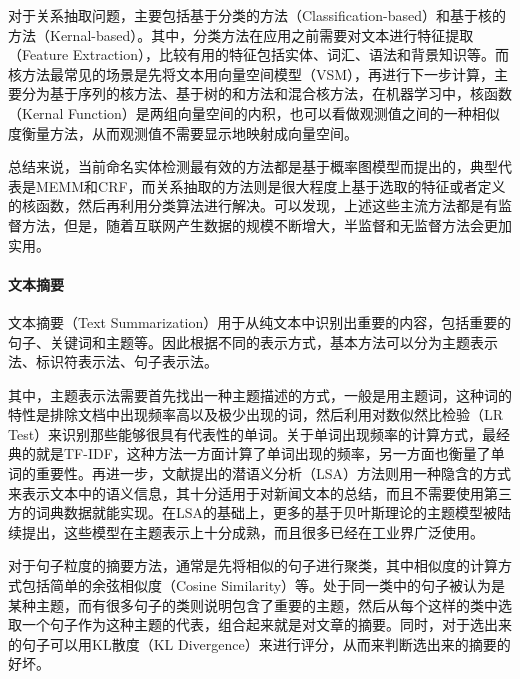 对于关系抽取问题，主要包括基于分类的方法（Classification-based）\cite{kambhatla2004combining,guodong2005exploring,jiang2007systematic,chan2010exploiting}和基于核的方法（Kernal-based）\cite{bunescu2005shortest,zhao2005extracting}。其中，分类方法在应用之前需要对文本进行特征提取（Feature Extraction），比较有用的特征包括实体、词汇、语法和背景知识等。而核方法最常见的场景是先将文本用向量空间模型（VSM），再进行下一步计算，主要分为基于序列的核方法、基于树的和方法和混合核方法，在机器学习中，核函数（Kernal Function）是两组向量空间的内积，也可以看做观测值之间的一种相似度衡量方法，从而观测值不需要显示地映射成向量空间。

总结来说，当前命名实体检测最有效的方法都是基于概率图模型而提出的，典型代表是MEMM和CRF，而关系抽取的方法则是很大程度上基于选取的特征或者定义的核函数，然后再利用分类算法进行解决。可以发现，上述这些主流方法都是有监督方法，但是，随着互联网产生数据的规模不断增大，半监督和无监督方法会更加实用。

\paragraph{文本摘要}
文本摘要（Text Summarization）用于从纯文本中识别出重要的内容，包括重要的句子、关键词和主题等。因此根据不同的表示方式，基本方法可以分为主题表示法、标识符表示法、句子表示法。

其中，主题表示法需要首先找出一种主题描述的方式，一般是用主题词，这种词的特性是排除文档中出现频率高以及极少出现的词，然后利用对数似然比检验（LR Test）来识别那些能够很具有代表性的单词\cite{dunning1993accurate}。关于单词出现频率的计算方式，最经典的就是TF-IDF\cite{gupta2007measuring}，这种方法一方面计算了单词出现的频率，另一方面也衡量了单词的重要性。再进一步，文献\cite{deerwester1990indexing}提出的潜语义分析（LSA）方法则用一种隐含的方式来表示文本中的语义信息，其十分适用于对新闻文本的总结，而且不需要使用第三方的词典数据就能实现。在LSA的基础上，更多的基于贝叶斯理论的主题模型被陆续提出，这些模型在主题表示上十分成熟，而且很多已经在工业界广泛使用\cite{daume2006bayesian,haghighi2009exploring,wang2009multi,celikyilmaz2010hybrid}。

对于句子粒度的摘要方法，通常是先将相似的句子进行聚类\cite{mckeown1999towards,hatzivassiloglou2001simfinder}，其中相似度的计算方式包括简单的余弦相似度（Cosine Similarity）等。处于同一类中的句子被认为是某种主题，而有很多句子的类则说明包含了重要的主题，然后从每个这样的类中选取一个句子作为这种主题的代表，组合起来就是对文章的摘要。同时，对于选出来的句子可以用KL散度（KL Divergence）来进行评分，从而来判断选出来的摘要的好坏。

